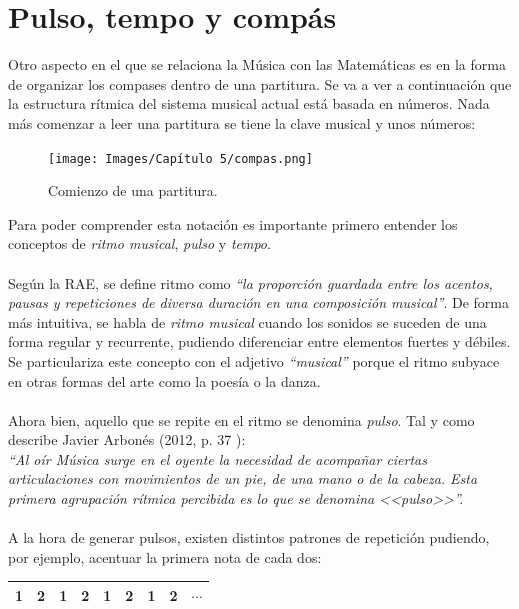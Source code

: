 \documentclass[a4paper, openright, 11pt, titlepage]{report}
\theoremstyle{definition}\newtheorem{defin}[propo]{Definition}
\theoremstyle{definition}\newtheorem{obser}[propo]{Remark}
\theoremstyle{definition}\newtheorem{ejem}[propo]{Ejemplo}
\theoremstyle{definition}\newtheorem{algoritmo}[propo]{Algoritmo}
\begin{document}
\chapter{Pulso, tempo y compás}
Otro aspecto en el que se relaciona la Música con las Matemáticas es en la forma de organizar los compases dentro de una partitura. Se va a ver a continuación que la estructura rítmica del sistema musical actual está basada en números. Nada más comenzar a leer una partitura se tiene la clave musical y unos números:
\begin{figure}[H]
    \centering
    \texttt{[image: Images/Capítulo 5/compas.png]}
    \caption{Comienzo de una partitura.}
\end{figure}
Para poder comprender esta notación es importante primero entender los conceptos de \textit{ritmo musical}, \textit{pulso} y \textit{tempo}.\\\\
Según la RAE, se define ritmo como \textit{``la proporción guardada entre los acentos, pausas y repeticiones de diversa duración en una composición musical''}. De forma más intuitiva, se habla de \textit{ritmo musical} cuando los sonidos se suceden de una forma regular y recurrente, pudiendo diferenciar entre elementos fuertes y débiles.\\
Se particulariza este concepto con el adjetivo \textit{``musical''} porque el ritmo subyace en otras formas del arte como la poesía o la danza.\\\\
Ahora bien, aquello que se repite en el ritmo se denomina \textit{pulso}. Tal y como describe Javier Arbonés (2012, p. 37 \cite{arbones}):\\
\textit{``Al oír Música surge en el oyente la necesidad de acompañar ciertas articulaciones con movimientos de un pie, de una mano o de la cabeza. Esta primera agrupación rítmica percibida es lo que se denomina <<pulso>>''.}\\\\
A la hora de generar pulsos, existen distintos patrones de repetición pudiendo, por ejemplo, acentuar la primera nota de cada dos:
\begin{table}[H]
    \centering
    \begin{tabular}{|c|c|c|c|c|c|c|c|c|}
    \hline
        \cellcolor{acento}1 & 2 & \cellcolor{acento}1 & 2 & \cellcolor{acento}1 & 2 & \cellcolor{acento}1 & 2 & $\cdots$ \\
    \hline
    \end{tabular}
\end{table}
\end{document}
